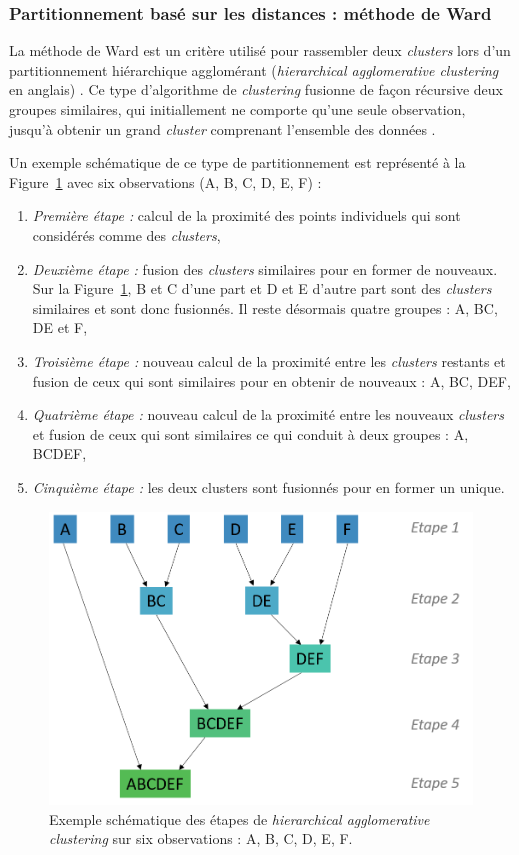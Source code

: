 \subsubsection{Partitionnement basé sur les distances : méthode de Ward}
La méthode de Ward est un critère utilisé pour rassembler deux \textit{clusters} lors d'un partitionnement hiérarchique agglomérant (\textit{hierarchical agglomerative clustering} 
en anglais) \citep{Ward1963}. Ce type d'algorithme de \textit{clustering} fusionne de façon récursive deux groupes similaires, qui initiallement ne comporte qu'une seule observation, jusqu'à obtenir un
grand \textit{cluster} comprenant l'ensemble des données \citep{James2013}.

Un exemple schématique de ce type de partitionnement est représenté à la Figure~\ref{Figure:tbr_hierarchical_agglomerative_clustering_example} avec six observations (A, B, C, D, E, F) :
\begin{enumerate}
\item \emph{Première étape :} calcul de la proximité des points individuels qui sont considérés comme des \textit{clusters},
\item \emph{Deuxième étape :} fusion des \textit{clusters} similaires pour en former de nouveaux. Sur la Figure~\ref{Figure:tbr_hierarchical_agglomerative_clustering_example}, B et C d'une part et D et E
d'autre part sont des \textit{clusters} similaires et sont donc fusionnés. Il reste désormais quatre groupes : A, BC, DE et F,
\item \emph{Troisième étape :} nouveau calcul de la proximité entre les \textit{clusters} restants et fusion de ceux qui sont similaires pour en obtenir de nouveaux : A, BC, DEF,
\item \emph{Quatrième étape :} nouveau calcul de la proximité entre les nouveaux \textit{clusters} et fusion de ceux qui sont similaires ce qui conduit à deux groupes : A, BCDEF,
\item \emph{Cinquième étape :} les deux clusters sont fusionnés pour en former un unique.
\end{enumerate}

\begin{figure}[h!]
  \centering
	\includegraphics[width=0.7\linewidth]{figures/chapter-4/tbr-hierarchical-agglomerative-clustering-example} 
  \caption{Exemple schématique des étapes de \textit{hierarchical agglomerative clustering} sur six observations : A, B, C, D, E, F.} 
	\label{Figure:tbr_hierarchical_agglomerative_clustering_example} 
\end{figure}

